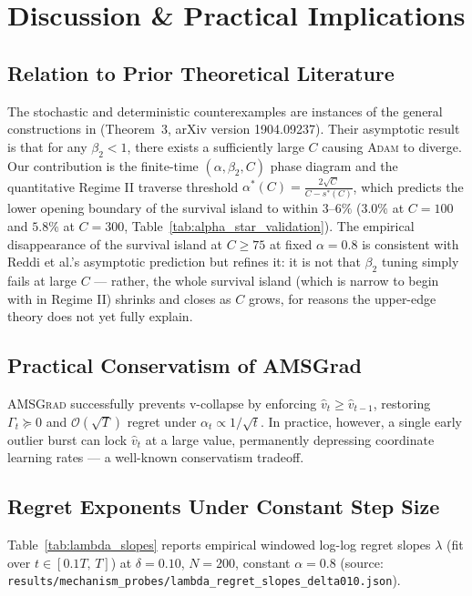 \section{Discussion \& Practical Implications}
\label{sec:discussion}

\subsection{Relation to Prior Theoretical Literature}
The stochastic and deterministic counterexamples are instances of the general constructions in \citet{reddi2018convergence} (Theorem~3, arXiv version 1904.09237). Their asymptotic result is that for any $\beta_2 < 1$, there exists a sufficiently large $C$ causing \textsc{Adam} to diverge. Our contribution is the finite-time $({\alpha}, \beta_2, C)$ phase diagram and the quantitative Regime II traverse threshold $\alpha^*(C) = \frac{2\sqrt{C}}{C - s^*(C)}$, which predicts the lower opening boundary of the survival island to within $3\text{--}6\%$ ($3.0\%$ at $C=100$ and $5.8\%$ at $C=300$, Table~\ref{tab:alpha_star_validation}). The empirical disappearance of the survival island at $C \ge 75$ at fixed $\alpha=0.8$ is consistent with Reddi et al.'s asymptotic prediction but refines it: it is not that $\beta_2$ tuning simply fails at large $C$ --- rather, the whole survival island (which is narrow to begin with in Regime II) shrinks and closes as $C$ grows, for reasons the upper-edge theory does not yet fully explain.

\subsection{Practical Conservatism of AMSGrad}
\textsc{AMSGrad} successfully prevents v-collapse by enforcing $\hat{v}_t \ge \hat{v}_{t-1}$, restoring $\Gamma_t \succeq 0$ and $\mathcal{O}(\sqrt{T})$ regret under $\alpha_t \propto 1/\sqrt{t}$. In practice, however, a single early outlier burst can lock $\hat{v}_t$ at a large value, permanently depressing coordinate learning rates --- a well-known conservatism tradeoff.

\subsection{Regret Exponents Under Constant Step Size}
Table~\ref{tab:lambda_slopes} reports empirical windowed log-log regret slopes $\lambda$ (fit over $t \in [0.1T,\, T]$) at $\delta=0.10$, $N=200$, constant $\alpha=0.8$ (source: \nolinkurl{results/mechanism_probes/lambda_regret_slopes_delta010.json}).

